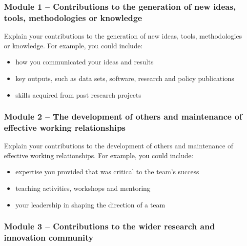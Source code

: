 

\subsubsection*{Module 1 – Contributions to the generation of new ideas, tools, methodologies or knowledge}

\begin{instruction}

Explain your contributions to the generation of new ideas, tools,
methodologies or knowledge. For example, you could include:

\begin{itemize}
    \item  how you communicated your ideas and results
    \item  key outputs, such as data sets, software, research and policy publications
    \item  skills acquired from past research projects
\end{itemize}

\end{instruction}



\subsubsection*{Module 2 – The development of others and maintenance of effective working relationships}

\begin{instruction}
Explain your contributions to the development of others and maintenance of
effective working relationships. For example, you could include:

\begin{itemize}
    \item expertise you provided that was critical to the team’s success
    \item teaching activities, workshops and mentoring
    \item your leadership in shaping the direction of a team
\end{itemize}

\end{instruction}



\subsubsection*{Module 3 – Contributions to the wider research and innovation community}

